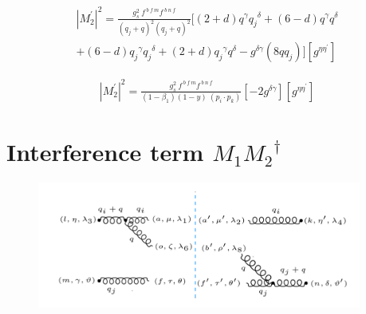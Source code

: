 \begin{equation}
\begin{split}
{|{M}^{\prime}_2|}^2 =\frac{g_s^2\: f^{\:b\:f\:m} f^{\:b\:n\:f}}{(q_j +q)^2 (q_j +q)^2}[(2+d)q^{\gamma}{q_j}^{\delta}+(6-d)q^{\gamma}{q}^{\delta}\\+(6-d){q_j}^{\gamma}{q_j}^{\delta}+(2+d){q_j}^{\gamma}{q}^{\delta}-g^{{\delta}{\gamma}}(8qq_j)][g^{{\eta}{{\eta}^{\prime}}}]
\end{split}
\end{equation}
%
%

\begin{equation}
\begin{split}
{|{M}^{\prime}_2|}^2 =\frac{g_s^2\: f^{\:b\:f\:m} f^{\:b\:n\:f}}{(1-\beta_1) (1-y)\:(p_i \cdot p_k)}[-2g^{{\delta}{\gamma}}][g^{{\eta}{{\eta}^{\prime}}}]
\end{split}
\end{equation}
\pagebreak

\section{Interference term $M_1 {M_2}^{\dagger}$}
\begin{figure}[h!]
\centering
\includegraphics[width=0.95\textwidth]{images/GG/M1M2Dagger.png}
\end{figure}

